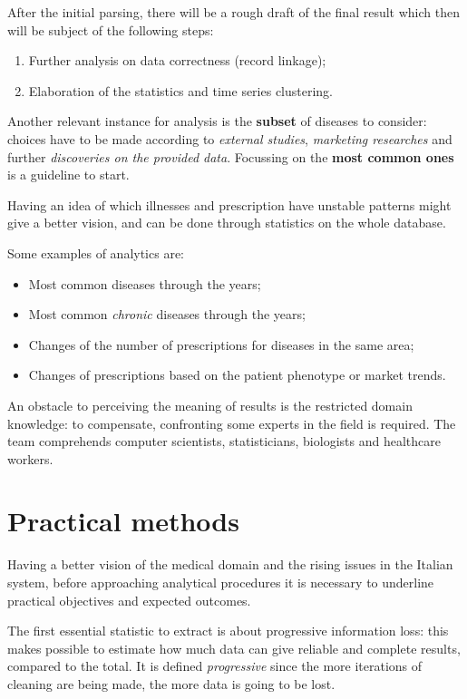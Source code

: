 After the initial parsing, there will be a rough draft of the final result which then will be subject of the following steps:
\begin{enumerate}
	\item Further analysis on data correctness (record linkage);
	\item Elaboration of the statistics and time series clustering.
\end{enumerate}

Another relevant instance for analysis is the \textbf{subset} of diseases to consider: choices have to be made according to \textit{external studies}, \textit{marketing researches} and further \textit{discoveries on the provided data}. Focussing on the \textbf{most common ones} is a guideline to start.

Having an idea of which illnesses and prescription have unstable patterns might give a better vision, and can be done through statistics on the whole database. 

Some examples of analytics are:
\begin{itemize}
	\item Most common diseases through the years;
	\item Most common \textit{chronic} diseases through the years;
	\item Changes of the number of prescriptions for diseases in the same area;
	\item Changes of prescriptions based on the patient phenotype or market trends.
\end{itemize}

An obstacle to perceiving the meaning of results is the restricted domain knowledge: to compensate, confronting some experts in the field is required. The team comprehends computer scientists, statisticians, biologists and healthcare workers.

\section{Practical methods}
Having a better vision of the medical domain and the rising issues in the Italian system, before approaching analytical procedures it is necessary to underline practical objectives and expected outcomes.

The first essential statistic to extract is about progressive information loss: this makes possible to estimate how much data can give reliable and complete results, compared to the total. It is defined \textit{progressive} since the more iterations of cleaning are being made, the more data is going to be lost. 

